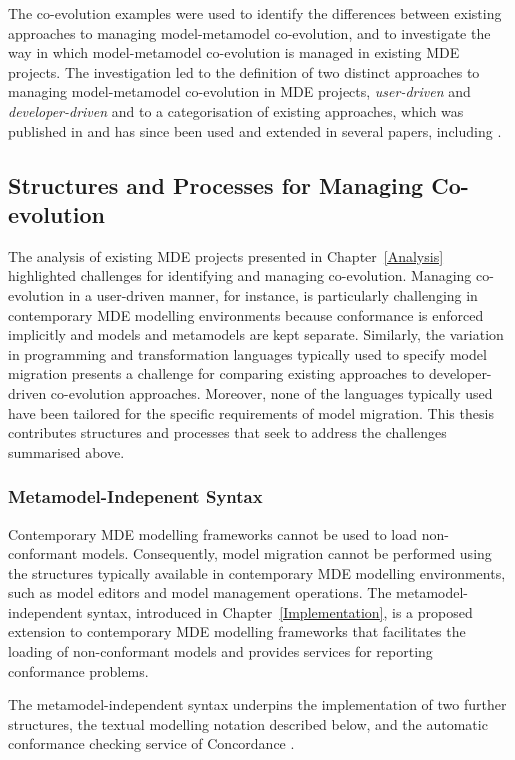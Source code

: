The co-evolution examples were used to identify the differences between existing approaches to managing model-metamodel co-evolution, and to investigate the way in which model-metamodel co-evolution is managed in existing MDE projects. The investigation led to the definition of two distinct approaches to managing model-metamodel co-evolution in MDE projects, \emph{user-driven} and \emph{developer-driven} and to a categorisation of existing approaches, which was published in \cite{rose09analysis} and has since been used and extended in several papers, including \cite{jurack10towards,mendez10towards}.


\subsection{Structures and Processes for Managing Co-evolution}
The analysis of existing MDE projects presented in Chapter~\ref{Analysis} highlighted challenges for identifying and managing co-evolution. Managing co-evolution in a user-driven manner, for instance, is particularly challenging in contemporary MDE modelling environments because conformance is enforced implicitly and models and metamodels are kept separate. Similarly, the variation in programming and transformation languages typically used to specify model migration presents a challenge for comparing existing approaches to developer-driven co-evolution approaches. Moreover, none of the languages typically used have been tailored for the specific requirements of model migration. This thesis contributes structures and processes that seek to address the challenges summarised above.

\subsubsection{Metamodel-Indepenent Syntax}
Contemporary MDE modelling frameworks cannot be used to load non-conf\-or\-ma\-nt models. Consequently, model migration cannot be performed using the structures typically available in contemporary MDE modelling environments, such as model editors and model management operations. The me\-ta\-mo\-del-ind\-ep\-en\-de\-nt syntax, introduced in Chapter~\ref{Implementation}, is a proposed extension to contemporary MDE modelling frameworks that facilitates the loading of non-con\-fo\-rm\-a\-nt models and provides services for reporting conformance problems.

The \cc metamodel-independent syntax underpins the implementation of two further structures, the textual modelling notation described below, and the automatic conformance checking service of Concordance \cite{rose10concordance}. 


